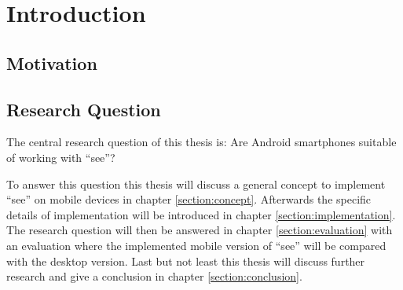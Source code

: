 \section{Introduction}
\subsection{Motivation}
\subsection{Research Question}
\label{research}
The central research question of this thesis is: Are Android smartphones suitable of working with \enquote{\gls{see}}?

To answer this question this thesis will discuss a general concept to implement \enquote{\gls{see}} on mobile devices in chapter \ref{section:concept}.
Afterwards the specific details of implementation will be introduced in chapter \ref{section:implementation}. 
The research question will then be answered in chapter \ref{section:evaluation} with an evaluation where the implemented mobile version of \enquote{\gls{see}} will be compared with the desktop version.
Last but not least this thesis will discuss further research and give a conclusion in chapter \ref{section:conclusion}.